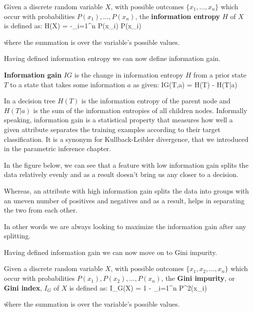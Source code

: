 Given a discrete random variable $X$, with possible outcomes $\{x_{1}, \ldots, x_{n} \}$ which occur with probabilities
$P(x_{1}), \ldots, P (x_{n})$, the \textbf{information entropy} $H$ of $X$ is defined as:
\bse
H(X) = -\sum _{i=1}^{n} {P(x_{i}) \log P(x_{i})}
\ese

\v

where the summation is over the variable's possible values.
\ed

Having defined information entropy we can now define information gain.

\textbf{Information gain} $IG$ is the change in information entropy $H$ from a prior state $T$ to a state that takes
some information $a$ as given:
\bse
IG(T,a) = H(T) - H(T|a)
\ese
\ed

In a decision tree $H(T)$ is the information entropy of the parent node and $H(T|a)$ is the sum of the information
entropies of all children nodes. Informally speaking, information gain is a statistical property that measures how
well a given attribute separates the training examples according to their target classification. It is a synonym for
Kullback-Leibler divergence, that we introduced in the parametric inference chapter.

\be
In the figure below, we can see that a feature with low information gain splits the data relatively evenly and as a
result doesn't bring us any closer to a decision.


Whereas, an attribute with high information gain splits the data into groups with an uneven number of positives and
negatives and as a result, helps in separating the two from each other.


In other words we are always looking to maximize the information gain after any splitting.
\ee

Having defined information gain we can now move on to Gini impurity.

Given a discrete random variable $X$, with possible outcomes $\{x_{1}, x_{2}, \ldots, x_{n} \}$ which occur with
probabilities $ P(x_{1}), P(x_{2}), \ldots, P(x_{n})$, the \textbf{Gini impurity}, or \textbf{Gini index}, $I_{G}$ of
$X$ is defined as:
\bse
I_{G}(X) = 1 - \sum _{i=1}^{n} P^2(x_{i})
\ese

\v

where the summation is over the variable's possible values.
\ed

